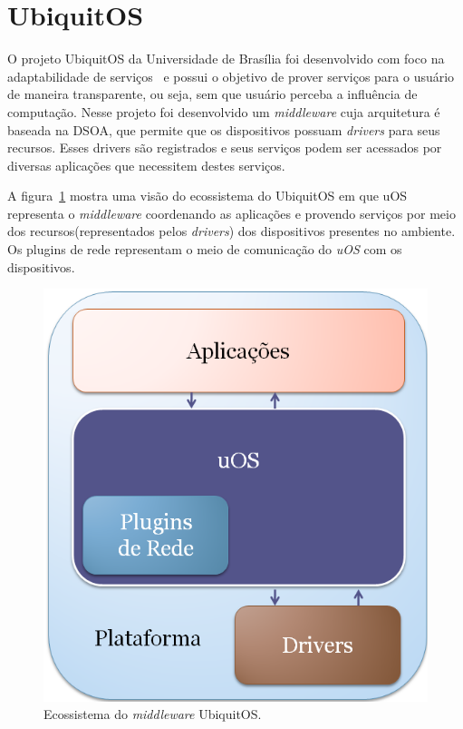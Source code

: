 \section{UbiquitOS}

O projeto UbiquitOS da Universidade de Brasília foi desenvolvido com foco na adaptabilidade de serviços~\cite{gomes2007} e possui o objetivo de prover serviços para o usuário de maneira transparente, ou seja, sem que usuário perceba a influência de computação. Nesse projeto foi desenvolvido um \emph{middleware} cuja arquitetura é baseada na DSOA, que permite que os dispositivos possuam \emph{drivers} para seus recursos. Esses drivers são registrados e seus serviços podem ser acessados por diversas aplicações que necessitem destes serviços.

A figura~\ref{fig:ubiquitos} mostra uma visão do ecossistema do UbiquitOS em que uOS representa o \emph{middleware} coordenando as aplicações e provendo serviços por meio dos recursos(representados pelos \emph{drivers}) dos dispositivos presentes no ambiente. Os plugins de rede representam o meio de comunicação do \emph{uOS} com os dispositivos.




\begin{figure}[ht]
	\center
	\includegraphics[scale=0.3]{imagens/ecossistemaUbiquitos}
	\caption{Ecossistema do \emph{middleware} UbiquitOS.}
	\label{fig:ubiquitos}
\end{figure}
